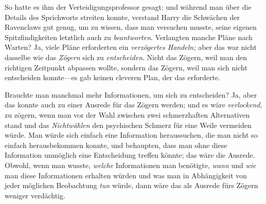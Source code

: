 
 

\hplettrineextrapara
So hatte es ihm der Verteidigungsprofessor gesagt; und während man über die Details des Sprichworts streiten konnte, verstand Harry die Schwächen der Ravenclaws gut genug, um zu wissen, dass man versuchen musste, seine eigenen Spitzfindigkeiten letztlich auch zu \emph{beantworten}. Verlangten manche Pläne nach Warten? Ja, viele Pläne erforderten ein \emph{verzögertes Handeln;} aber das war nicht dasselbe wie das \emph{Zögern} sich zu \emph{entscheiden}. Nicht das Zögern, weil man den richtigen Zeitpunkt abpassen wollte, sondern das Zögern, weil man sich nicht entscheiden konnte—es gab keinen cleveren Plan, der das erforderte.

Brauchte man manchmal mehr Informationen, um sich zu entscheiden? Ja, aber das konnte auch zu einer Ausrede für das Zögern werden; und es wäre \emph{verlockend}, zu zögern, wenn man vor der Wahl zwischen zwei schmerzhaften Alternativen stand und das \emph{Nichtwählen} den psychischen Schmerz für eine Weile vermeiden würde. Man würde sich einfach eine Information heraussuchen, die man nicht so einfach herausbekommen konnte, und behaupten, dass man ohne diese Information unmöglich eine Entscheidung treffen könnte; das wäre die Ausrede. Obwohl, wenn man wusste, \emph{welche} Informationen man benötigte, \emph{wann} und \emph{wie} man diese Informationen erhalten würden und was man in Abhängigkeit von jeder möglichen Beobachtung \emph{tun} würde, dann wäre das als Ausrede fürs Zögern weniger verdächtig.

